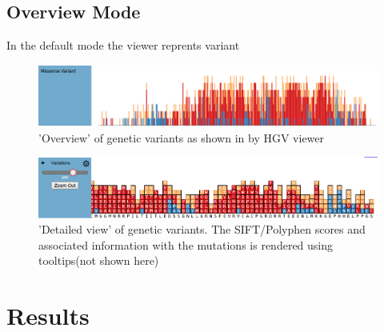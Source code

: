 \documentclass[twoside]{article}
\begin{document}
\begin{multicols}{2}
\begin{compactitem}
\subsection{Overview Mode}
In the default mode the viewer reprents variant 
\end{compactitem}

\begin{figure}
\includegraphics[width=\linewidth]{openview0}
\caption{'Overview' of genetic variants as shown in by HGV viewer}
\end{figure}

\begin{figure}
\includegraphics[width=\linewidth]{zoomed0}
\caption{'Detailed view' of genetic variants. The SIFT/Polyphen scores and associated information with the mutations is rendered using tooltips(not shown here)}
\end{figure}




\section{Results}





\end{multicols}
\end{document}
